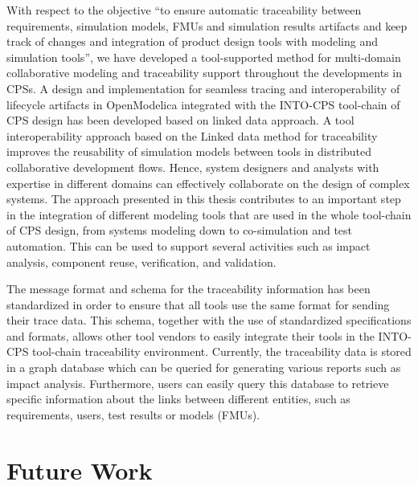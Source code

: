 With respect to the objective “to ensure automatic traceability between requirements, simulation models, FMUs and simulation results artifacts and keep track of changes and integration of product design tools with modeling and simulation tools”, we have developed a tool-supported method for multi-domain  collaborative modeling and traceability support throughout the developments in CPSs. A design and implementation for seamless tracing and interoperability of lifecycle artifacts in OpenModelica integrated with the INTO-CPS tool-chain of CPS design has been developed based on linked data approach. A tool interoperability approach based on the Linked data method for traceability improves the reusability of simulation models between tools in distributed collaborative development flows. Hence, system designers and analysts with expertise in different domains can effectively collaborate on the design of complex systems. The approach presented in this thesis contributes to an important step in the integration of different modeling tools that are used in the whole tool-chain of CPS design, from systems modeling down to co-simulation and test automation. This can be used to support several activities such as impact analysis, component reuse, verification, and validation. 

The message format and schema for the traceability information has been standardized in order to ensure that all tools use the same format for sending their trace data. This schema, together with the use of standardized specifications and formats, allows other tool vendors to easily integrate their tools in the INTO-CPS tool-chain traceability environment. Currently, the traceability data is stored in a graph database which can be queried for generating various reports such as impact analysis. Furthermore, users can easily query this database to retrieve specific information about the links between different entities, such as requirements, users, test results or models (FMUs).

\section{Future Work}
\label{sec:futurework}




